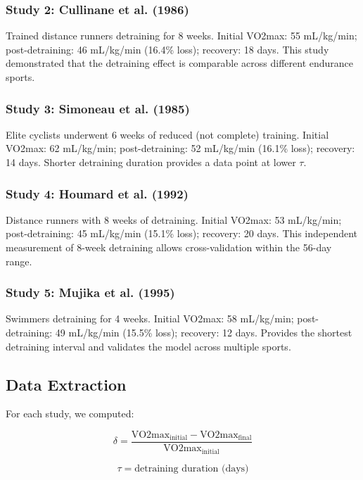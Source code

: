 \documentclass[12pt,a4paper]{article}
\begin{document}
\subsubsection{Study 2: Cullinane et al. (1986)}
Trained distance runners detraining for 8 weeks. Initial VO2max: 55 mL/kg/min; post-detraining: 46 mL/kg/min (16.4\% loss); recovery: 18 days. This study demonstrated that the detraining effect is comparable across different endurance sports.

\subsubsection{Study 3: Simoneau et al. (1985)}
Elite cyclists underwent 6 weeks of reduced (not complete) training. Initial VO2max: 62 mL/kg/min; post-detraining: 52 mL/kg/min (16.1\% loss); recovery: 14 days. Shorter detraining duration provides a data point at lower $\tau$.

\subsubsection{Study 4: Houmard et al. (1992)}
Distance runners with 8 weeks of detraining. Initial VO2max: 53 mL/kg/min; post-detraining: 45 mL/kg/min (15.1\% loss); recovery: 20 days. This independent measurement of 8-week detraining allows cross-validation within the 56-day range.

\subsubsection{Study 5: Mujika et al. (1995)}
Swimmers detraining for 4 weeks. Initial VO2max: 58 mL/kg/min; post-detraining: 49 mL/kg/min (15.5\% loss); recovery: 12 days. Provides the shortest detraining interval and validates the model across multiple sports.

\subsection{Data Extraction}

For each study, we computed:

\begin{equation}
\delta = \frac{\text{VO2max}_{\text{initial}} - \text{VO2max}_{\text{final}}}{\text{VO2max}_{\text{initial}}}
\end{equation}

\begin{equation}
\tau = \text{detraining duration (days)}
\end{equation}
\end{document}

